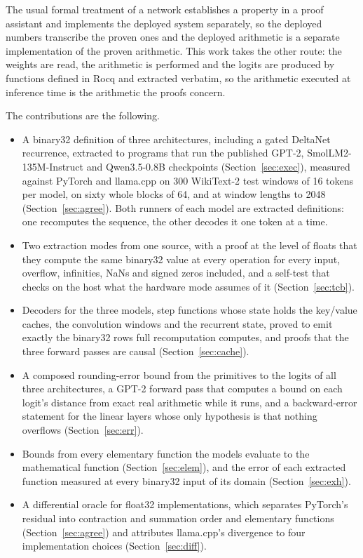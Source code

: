\documentclass[11pt]{article}
\theoremstyle{plain}
\theoremstyle{definition}
\begin{document}
The usual formal treatment of a network establishes a property in a proof
assistant and implements the deployed system separately, so the deployed
numbers transcribe the proven ones and the deployed arithmetic is a separate
implementation of the proven arithmetic. This work takes the other route: the
weights are read, the arithmetic is performed and the logits are produced by
functions defined in Rocq and extracted verbatim, so the arithmetic executed at
inference time is the arithmetic the proofs concern.

The contributions are the following.
\begin{itemize}
\item A binary32 definition of three architectures, including a gated DeltaNet
  recurrence, extracted to programs that run the published GPT-2,
  SmolLM2-135M-Instruct and Qwen3.5-0.8B checkpoints
  (Section~\ref{sec:exec}), measured against PyTorch and llama.cpp on 300
  WikiText-2 test windows of 16 tokens per model, on sixty whole blocks of 64, and at
  window lengths to 2048 (Section~\ref{sec:agree}). Both runners of each model
  are extracted definitions: one recomputes the sequence, the other decodes it
  one token at a time.
\item Two extraction modes from one source, with a proof at the level of floats
  that they compute the same binary32 value at every operation for every input,
  overflow, infinities, NaNs and signed zeros included, and a self-test that
  checks on the host what the hardware mode assumes of it
  (Section~\ref{sec:tcb}).
\item Decoders for the three models, step functions whose state holds the
  key/value caches, the convolution windows and the recurrent state, proved to
  emit exactly the binary32 rows full recomputation computes, and proofs that
  the three forward passes are causal (Section~\ref{sec:cache}).
\item A composed rounding-error bound from the primitives to the logits of all
  three architectures, a GPT-2 forward pass that computes a bound on each
  logit's distance from exact real arithmetic while it runs, and a
  backward-error statement for the linear layers whose only hypothesis is that
  nothing overflows (Section~\ref{sec:err}).
\item Bounds from every elementary function the models evaluate to the
  mathematical function (Section~\ref{sec:elem}), and the error of each
  extracted function measured at every binary32 input of its domain
  (Section~\ref{sec:exh}).
\item A differential oracle for float32 implementations, which separates
  PyTorch's residual into contraction and summation order and elementary
  functions
  (Section~\ref{sec:agree}) and attributes llama.cpp's divergence to four
  implementation choices (Section~\ref{sec:diff}).
\end{itemize}
\end{document}

